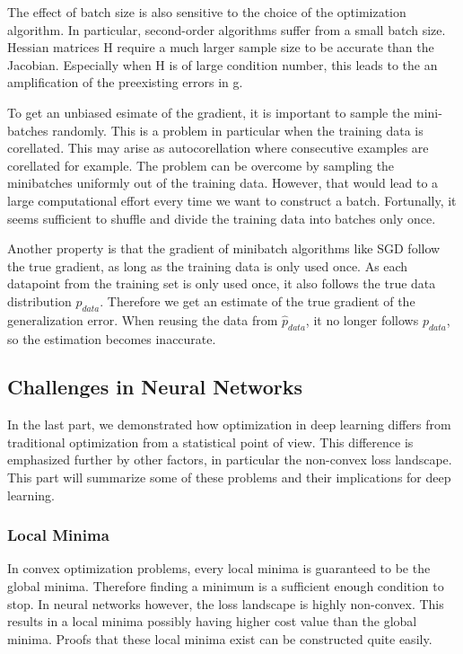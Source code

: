 The effect of batch size is also sensitive to the choice of the optimization
algorithm. In particular, second-order algorithms suffer from a small batch
size. Hessian matrices H require a much larger sample size to be accurate than
the Jacobian. Especially when H is of large condition number, this leads to the
an amplification of the preexisting errors in g.

To get an unbiased esimate of the gradient, it is important to sample the
mini-batches randomly. This is a problem in particular when the training data is
corellated. This may arise as autocorellation where consecutive examples are
corellated for example. The problem can be overcome by sampling the minibatches
uniformly out of the training data. However, that would lead to a large
computational effort every time we want to construct a batch. Fortunally, it
seems sufficient to shuffle and divide the training data into batches only once.

Another property is that the gradient of minibatch algorithms like SGD follow
the true gradient, as long as the training data is only used once. As each
datapoint from the training set is only used once, it also follows the true data
distribution $p_{data}$. Therefore we get an estimate of the true gradient of
the generalization error. When reusing the data from $\hat{p}_{data}$, it no
longer follows $p_{data}$, so the estimation becomes inaccurate.

\subsection{Challenges in Neural Networks}
In the last part, we demonstrated how optimization in deep learning differs from
traditional optimization from a statistical point of view. This difference is
emphasized further by other factors, in particular the non-convex loss
landscape. This part will summarize some of these problems and their
implications for deep learning.


\subsubsection{Local Minima}
In convex optimization problems, every local minima is guaranteed to be the
global minima. Therefore finding a minimum is a sufficient enough condition to
stop. In neural networks however, the loss landscape is highly non-convex. This
results in a local minima possibly having higher cost value than the global
minima. Proofs that these local minima exist can be constructed quite easily.

